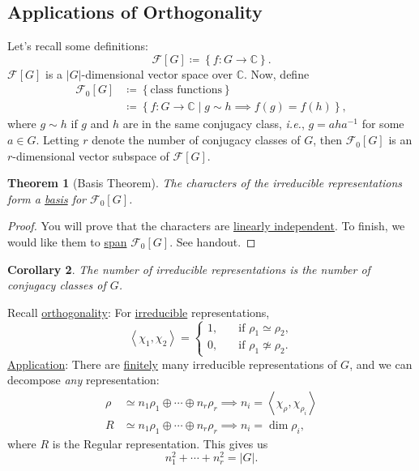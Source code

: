 \documentclass[12pt]{article}
\newcommand{\cx}{\mathbb{C}}
\newcommand{\ita}[1]{\textit{#1}}
\newcommand\inv[1]{#1^{-1}}
\newcommand\setb[1]{\left \{ #1 \right \}}
\newcommand{\vbrack}[1]{\left \langle #1 \right \rangle}
\newtheorem{theorem}{Theorem}[section]
\newtheorem{corollary}[theorem]{Corollary}
\theoremstyle{definition}
\begin{document}
\subsection{Applications of Orthogonality}
Let's recall some definitions:
\begin{equation}
    \mathcal{F}[G] \coloneqq  \setb{f : G \to \cx}.
\end{equation}
$\mathcal{F}[G]$ is a $|G|$-dimensional vector space over $\cx$. Now, define 
\begin{equation}
    \begin{split}
        \mathcal{F}_0[G] & \coloneqq  \setb{\text{class functions}} \\
        & \coloneqq  \setb{ f : G \to \cx \mid g \sim h \implies f(g) = f(h)},
    \end{split}
\end{equation}
where $g \sim h$ if $g$ and $h$ are in the same conjugacy class, \ita{i.e.}, $g = a h \inv{a}$ for some $a \in G$. Letting $r$ denote the number of conjugacy classes of $G$, then $\mathcal{F}_0[G]$ is an $r$-dimensional vector subspace of $\mathcal{F}[G]$.
\begin{theorem}[Basis Theorem]
    The characters of the irreducible representations form a \underline{basis} for $\mathcal{F}_0[G]$.
\end{theorem}
\begin{proof}
    You will prove that the characters are \underline{linearly independent}. To finish, we would like them to \underline{span} $\mathcal{F}_0[G]$. See handout.
\end{proof}
\begin{corollary}
    The number of irreducible representations is the number of conjugacy classes of $G$.
\end{corollary}
Recall \underline{orthogonality}: For \underline{irreducible} representations,
\begin{equation}
    \vbrack{\chi_1 , \chi_2} = 
    \begin{cases}
        1 , & \quad \text{if } \rho_1 \simeq \rho_2 , \\
        0 , & \quad \text{if } \rho_1 \not \simeq \rho_2.
    \end{cases}
\end{equation}
\noindent \underline{Application}: There are \underline{finitely} many irreducible representations of $G$, and we can decompose \ita{any} representation:
\begin{equation}
    \begin{split}
        \rho & \simeq n_1 \rho_1 \oplus \dotsb \oplus n_r \rho_r \implies n_i = \boxed{\vbrack{\chi_{\rho} , \chi_{\rho_i}}} \\
        R & \simeq n_1 \rho_1 \oplus \dotsb \oplus n_r \rho_r \implies n_i = \boxed{\dim \rho_i,}
    \end{split}
\end{equation}
where $R$ is the Regular representation. This gives us
\begin{equation}
    \boxed{n_1^2 + \dotsb + n_r^2 = |G|.}
\end{equation}
\end{document}
